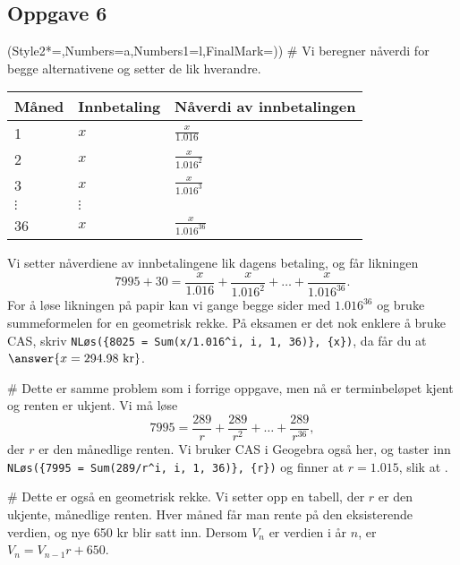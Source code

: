 \subsection*{Oppgave 6}
\begin{easylist}[enumerate]
	\ListProperties(Style2*=,Numbers=a,Numbers1=l,FinalMark={)})
	# Vi beregner nåverdi for begge alternativene og setter de lik hverandre.
	
	\begin{center}
		\begin{tabular}{lll}
			Måned & Innbetaling & Nåverdi av innbetalingen \\ \hline
			1 & $x$ & $\frac{x}{1.016}$ \\
			2 & $x$ & $\frac{x}{1.016^2}$ \\
			3 & $x$ & $\frac{x}{1.016^3}$ \\
			$\vdots$ & $\vdots$ \\
			36 & $x$ & $\frac{x}{1.016^{36}}$ \\
		\end{tabular}
	\end{center}
	Vi setter nåverdiene av innbetalingene lik dagens betaling, og får likningen
	\begin{equation*}
		7995 + 30 = \frac{x}{1.016} + \frac{x}{1.016^2} + \dots + \frac{x}{1.016^{36}}.
	\end{equation*}
	For å løse likningen på papir kan vi gange begge sider med $1.016^{36}$
	og bruke summeformelen for en geometrisk rekke.
	På eksamen er det nok enklere å bruke CAS, skriv 
	\verb|NLøs({8025 = Sum(x/1.016^i, i, 1, 36)}, {x})|,
	da får du at $\answer{x = 294.98 \text{ kr}}$.

	# Dette er samme problem som i forrige oppgave, men nå er terminbeløpet kjent og renten er ukjent. Vi må løse
	\begin{equation*}
		7995 = \frac{289}{r} + \frac{289}{r^2} + \dots + \frac{289}{r^{36}},
	\end{equation*}
	der $r$ er den månedlige renten. Vi bruker CAS i Geogebra også her, og taster inn 
	\verb|NLøs({7995 = Sum(289/r^i, i, 1, 36)}, {r})| og finner at $r = 1.015$, slik at .
	
	# Dette er også en geometrisk rekke. Vi setter opp en tabell,
	der $r$ er den ukjente, månedlige renten.
	Hver måned får man rente på den eksisterende verdien, og nye 650 kr 
	blir satt inn. Dersom $V_n$ er verdien i år $n$, er $V_n = V_{n-1} r + 650$.
	

\end{easylist}
